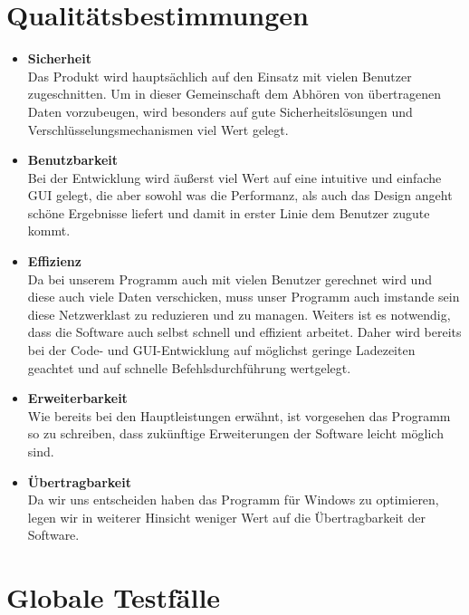 \documentclass[a4paper,12pt]{scrreprt}
\begin{document}
\chapter{Qualitätsbestimmungen}
\begin{itemize}
	\item {\LARGE\textbf{Sicherheit}}\\
	Das Produkt wird hauptsächlich auf den Einsatz mit vielen Benutzer zugeschnitten. Um in dieser Gemeinschaft dem Abhören von übertragenen Daten vorzubeugen, wird besonders auf gute Sicherheitslösungen und Verschlüsselungsmechanismen viel Wert gelegt.
	\item {\LARGE\textbf{Benutzbarkeit}}\\
	Bei der Entwicklung wird äußerst viel Wert auf eine intuitive und einfache GUI gelegt, die aber sowohl was die Performanz, als auch das Design angeht schöne Ergebnisse liefert und damit in erster Linie dem Benutzer zugute kommt.
	\item {\LARGE\textbf{Effizienz}}\\
	Da bei unserem Programm auch mit vielen Benutzer gerechnet wird und diese auch viele Daten verschicken, muss unser Programm auch imstande sein diese Netzwerklast zu reduzieren und zu managen. Weiters ist es notwendig, dass die Software auch selbst schnell und effizient arbeitet. Daher wird bereits bei der Code- und GUI-Entwicklung auf möglichst geringe Ladezeiten geachtet und auf schnelle Befehlsdurchführung wertgelegt.
	\item {\LARGE\textbf{Erweiterbarkeit}}\\
	Wie bereits bei den Hauptleistungen erwähnt, ist vorgesehen das Programm so zu schreiben, dass zukünftige Erweiterungen der Software leicht möglich sind.
	\item {\LARGE\textbf{Übertragbarkeit}}	\\
	Da wir uns entscheiden haben das Programm für Windows zu optimieren, legen wir in weiterer Hinsicht weniger Wert auf die Übertragbarkeit der Software.
	\end{itemize}
\chapter{Globale Testfälle}
\end{document}
